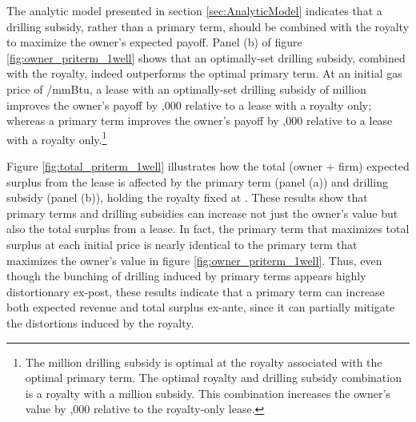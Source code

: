 \documentclass[12pt]{article}
\begin{document}
The analytic model presented in section \ref{sec:AnalyticModel} indicates that a drilling subsidy, rather than a primary term, should be combined with the royalty to maximize the owner's expected payoff. Panel (b) of figure \ref{fig:owner_priterm_1well} shows that an optimally-set drilling subsidy, combined with the royalty, indeed outperforms the optimal primary term. At an initial gas price of \unskip /mmBtu, a lease with an optimally-set drilling subsidy of million improves the owner's payoff by \unskip ,000 relative to a lease with a royalty only; whereas a primary term improves the owner's payoff by \unskip ,000 relative to a lease with a royalty only.\footnote{The million drilling subsidy is optimal at the royalty associated with the optimal primary term. The optimal royalty and drilling subsidy combination is a royalty with a million subsidy. This combination increases the owner's value by \unskip ,000 relative to the royalty-only lease.}

Figure \ref{fig:total_priterm_1well} illustrates how the total (owner + firm) expected surplus from the lease is affected by the primary term (panel (a)) and drilling subsidy (panel (b)), holding the royalty fixed at \unskip. These results show that primary terms and drilling subsidies can increase not just the owner's value but also the total surplus from a lease. In fact, the primary term that maximizes total surplus at each initial price is nearly identical to the primary term that maximizes the owner's value in figure \ref{fig:owner_priterm_1well}. Thus, even though the bunching of drilling induced by primary terms appears highly distortionary ex-post, these results indicate that a primary term can increase both expected revenue and total surplus ex-ante, since it can partially mitigate the distortions induced by the royalty.
\end{document}
